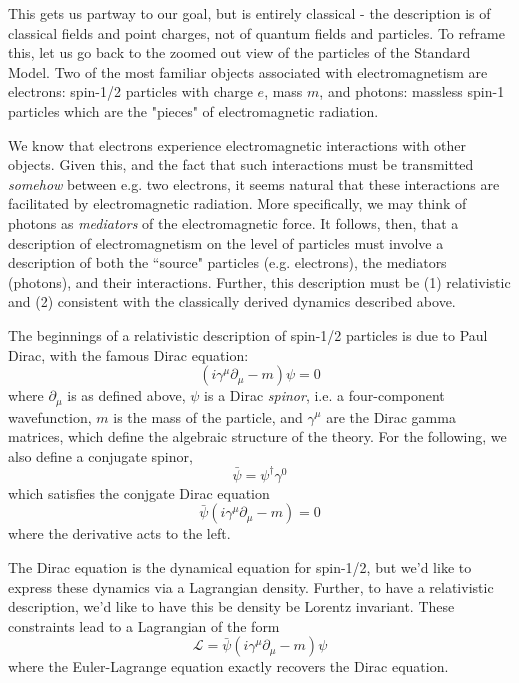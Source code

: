 This gets us partway to our goal, but is entirely classical - the description is of classical fields and 
point charges, not of quantum fields and particles. To reframe this, let us go back to the zoomed out view 
of the particles of the Standard Model. Two of the most familiar objects associated with electromagnetism 
are electrons: spin-1/2 particles with charge $e$, mass $m$, and photons: massless spin-1 particles which are
the "pieces" of electromagnetic radiation.

We know that electrons experience electromagnetic interactions with other objects. Given this, and the 
fact that such interactions must be transmitted \emph{somehow} between e.g. two electrons, it seems natural 
that these interactions are facilitated by electromagnetic radiation. More specifically, we may think of 
photons as \emph{mediators} of the electromagnetic force. It follows, then, that a description of 
electromagnetism on the level of particles must involve a description of both the ``source" particles 
(e.g. electrons), the mediators (photons), and their interactions. Further, this description must be 
(1) relativistic and (2) consistent with the classically derived dynamics described above.

The beginnings of a relativistic description of spin-1/2 particles is due to Paul Dirac, with the 
famous Dirac equation:
\begin{equation}
(i\gamma^{\mu}\partial_{\mu} - m)\psi = 0
\end{equation}
where $\partial_{\mu}$ is as defined above, $\psi$ is a Dirac \emph{spinor}, i.e. a four-component 
wavefunction, $m$ is the mass of the particle, and $\gamma^{\mu}$ are the Dirac gamma matrices, 
which define the algebraic structure of the theory. For the following, we also define a conjugate spinor,
\begin{equation}
\bar{\psi} = \psi^{\dagger}\gamma^{0}
\end{equation}
which satisfies the conjgate Dirac equation
\begin{equation}
\bar{\psi}(i\gamma^{\mu}\partial_{\mu} - m) = 0
\end{equation}
where the derivative acts to the left.

The Dirac equation is the dynamical equation for spin-1/2, but we'd like to express these dynamics 
via a Lagrangian density. Further, to have a relativistic description, we'd like to have this be 
density be Lorentz invariant. These constraints lead to a Lagrangian of the form
\begin{equation}
\mathcal{L} = \bar{\psi}(i\gamma^{\mu}\partial_{\mu} - m)\psi 
\end{equation}
where the Euler-Lagrange equation exactly recovers the Dirac equation.


